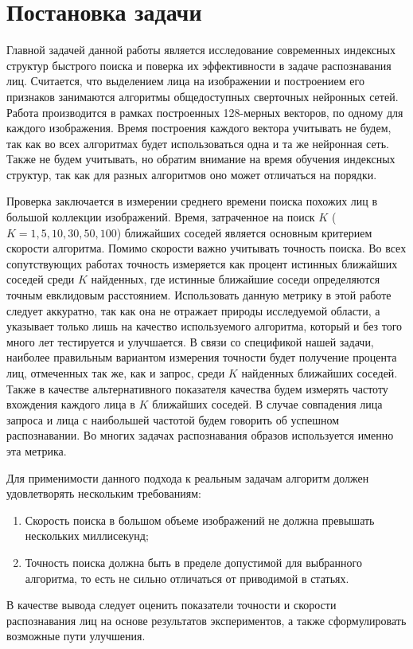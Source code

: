 \section{Постановка задачи}
\label{sec:Chapter1} 

Главной задачей данной работы является исследование современных индексных структур быстрого поиска и поверка их эффективности в задаче распознавания лиц. Считается, что выделением лица на изображении и построением его признаков занимаются алгоритмы общедоступных сверточных нейронных сетей. Работа производится в рамках построенных 128-мерных векторов, по одному для каждого изображения. Время построения каждого вектора учитывать не будем, так как во всех алгоритмах будет использоваться одна и та же нейронная сеть. Также не будем учитывать, но обратим внимание на время обучения индексных структур, так как для разных алгоритмов оно может отличаться на порядки.

Проверка заключается в измерении среднего времени поиска похожих лиц в большой коллекции изображений. Время, затраченное на поиск $K$ ($K = 1, 5, 10, 30, 50, 100$) ближайших соседей является основным критерием скорости алгоритма. Помимо скорости важно учитывать точность поиска. Во всех сопутствующих работах \cite{1,3,5,6,7} точность измеряется как процент истинных ближайших соседей среди $K$ найденных, где истинные ближайшие соседи определяются точным евклидовым расстоянием. Использовать данную метрику в этой работе следует аккуратно, так как она не отражает природы исследуемой области, а указывает только лишь на качество используемого алгоритма, который и без того много лет тестируется и улучшается. В связи со спецификой нашей задачи, наиболее правильным вариантом измерения точности будет получение процента лиц, отмеченных так же, как и запрос, среди $K$ найденных ближайших соседей. Также в качестве альтернативного показателя качества будем измерять частоту вхождения каждого лица в $K$ ближайших соседей. В случае совпадения лица запроса и лица с наибольшей частотой будем говорить об успешном распознавании. Во многих задачах распознавания образов используется именно эта метрика.

Для применимости данного подхода к реальным задачам алгоритм должен удовлетворять нескольким требованиям:
\begin{enumerate} 
\item Скорость поиска в большом объеме изображений не должна превышать нескольких миллисекунд;
\item Точность поиска должна быть в пределе допустимой для выбранного алгоритма, то есть не сильно отличаться от приводимой в статьях.
\end{enumerate} 

В качестве вывода следует оценить показатели точности и скорости распознавания лиц на основе результатов экспериментов, а также сформулировать возможные пути улучшения.

